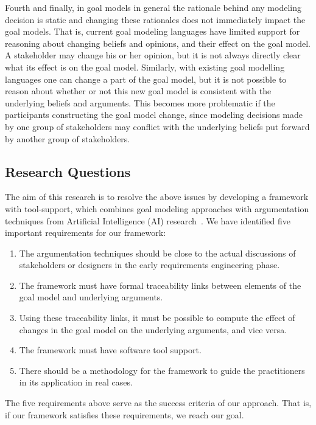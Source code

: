 Fourth and finally, in goal models in general the rationale behind any modeling decision is static and changing these rationales does not immediately impact the goal models. That is, current goal modeling languages have limited support for reasoning about changing beliefs and opinions, and their effect on the goal model. A stakeholder may change his or her opinion, but it is not always directly clear what its effect is on the goal model. Similarly, with existing goal modelling languages one can change a part of the goal model, but it is not possible to reason about whether or not this new goal model is consistent with the underlying beliefs and arguments. This becomes more problematic if the participants constructing the goal model change, since modeling decisions made by one group of stakeholders may conflict with the underlying beliefs put forward by another group of stakeholders.


\subsection{Research Questions}
 
The aim of this research is to resolve the above issues by developing a framework with tool-support, which combines goal modeling approaches with argumentation techniques from Artificial Intelligence (AI) research~\cite{atkinson2007}. We have identified five important requirements for our framework: 
\begin{enumerate}
\item The argumentation techniques should be close to the actual discussions of stakeholders or designers in the early requirements engineering phase.
\item 
The framework must have formal traceability links between elements of the goal model and underlying arguments.
\item 
Using these traceability links, it must be possible to compute the effect of changes in the goal model on the underlying arguments, and vice versa.
\item 
The framework must have software tool support.
\item 
There should be a methodology for the framework to guide the practitioners in its application in real cases.
\end{enumerate}

The five requirements above serve as the success criteria of our approach. That is, if our framework satisfies these requirements, we reach our goal. 

